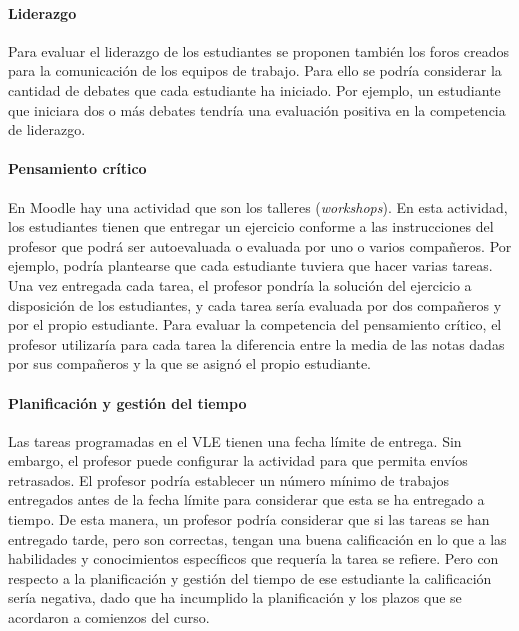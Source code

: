 \paragraph*{Liderazgo}
Para evaluar el liderazgo de los estudiantes se proponen también los foros creados para la comunicación de los equipos de trabajo. Para ello se podría considerar la cantidad de debates que cada estudiante ha iniciado. Por ejemplo, un estudiante que iniciara dos o más debates tendría una evaluación positiva en la competencia de liderazgo.

\paragraph*{Pensamiento crítico}
En Moodle hay una actividad que son los talleres (\emph{workshops}). En esta actividad, los estudiantes tienen que entregar un ejercicio conforme a las instrucciones del profesor que podrá ser autoevaluada o evaluada por uno o varios compañeros. Por ejemplo, podría plantearse que cada estudiante tuviera que hacer varias tareas. Una vez entregada cada tarea, el profesor pondría la solución del ejercicio a disposición de los estudiantes, y cada tarea sería evaluada por dos compañeros y por el propio estudiante. Para evaluar la competencia del pensamiento crítico, el profesor utilizaría para cada tarea la diferencia entre la media de las notas dadas por sus compañeros y la que se asignó el propio estudiante.

\paragraph*{Planificación y gestión del tiempo}
Las tareas programadas en el VLE tienen una fecha límite de entrega. Sin embargo, el profesor puede configurar la actividad para que permita envíos retrasados. El profesor podría establecer un número mínimo de trabajos entregados antes de la fecha límite para considerar que esta se ha entregado a tiempo. De esta manera, un profesor podría considerar que si las tareas se han entregado tarde, pero son correctas, tengan una buena calificación en lo que a las habilidades y conocimientos específicos que requería la tarea se refiere. Pero con respecto a la planificación y gestión del tiempo de ese estudiante la calificación sería negativa, dado que ha incumplido la planificación y los plazos que se acordaron a comienzos del curso.

